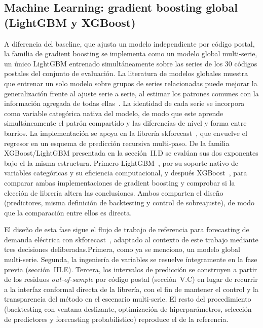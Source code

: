 \documentclass[12pt, a4paper]{article}
\begin{document}
\subsection{Machine Learning: gradient boosting global (LightGBM y XGBoost)}

A diferencia del baseline, que ajusta un modelo independiente por código postal, la familia de gradient boosting se implementa como un modelo global multi-serie, un único LightGBM entrenado simultáneamente sobre las series de los 30 códigos postales del conjunto de evaluación. La literatura de modelos globales muestra que entrenar un solo modelo sobre grupos de series relacionadas puede mejorar la generalización frente al ajuste serie a serie, al estimar los patrones comunes con la información agregada de todas ellas~\cite{montero2021}. La identidad de cada serie se incorpora como variable categórica nativa del modelo, de modo que este aprende simultáneamente el patrón compartido y las diferencias de nivel y forma entre barrios. La implementación se apoya en la librería skforecast~\cite{skforecast}, que envuelve el regresor en un esquema de predicción recursiva multi-paso. De la familia XGBoost/LightGBM presentada en la sección~II.D se evalúan sus dos exponentes bajo el la misma estructura. Primero LightGBM~\cite{ke2017}, por su soporte nativo de variables categóricas y su eficiencia computacional, y después XGBoost~\cite{chen2016}, para comparar ambas implementaciones de gradient boosting y comprobar si la elección de librería altera las conclusiones. Ambos comparten el  diseño (predictores, misma definición de backtesting y control de sobreajuste), de modo que la comparación entre ellos es directa.

El diseño de esta fase sigue el flujo de trabajo de referencia para forecasting de demanda eléctrica con skforecast~\cite{skforecast}, adaptado al contexto de este trabajo mediante tres decisiones deliberadas.Primera, como ya se menciono, un modelo global multi-serie. Segunda, la ingeniería de variables se resuelve íntegramente en la fase previa (sección~III.E). Tercera, los intervalos de predicción se construyen a partir de los residuos \textit{out-of-sample} por código postal (sección~V.C) en lugar de recurrir a la interfaz conformal directa de la librería, con el fin de mantener el control y la transparencia del método en el escenario multi-serie. El resto del procedimiento (backtesting con ventana deslizante, optimización de hiperparámetros, selección de predictores y forecasting probabilístico) reproduce el de la referencia.
\end{document}
